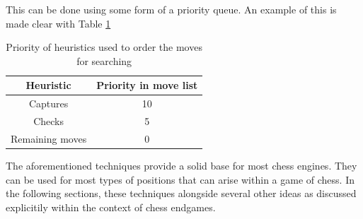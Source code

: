 This can be done using some form of a priority queue. An example of this is made clear with Table \ref{tab:heuristicPriorityTable}

\begin{table}[H]
    \centering
    \begin{tabular}{ ||c c|| } 
      \hline
      Heuristic & Priority in move list\\ 
      \hline\hline
      Captures & 10 \\ 
      \hline
      Checks & 5 \\
      \hline
      Remaining moves & 0 \\
      \hline
    \end{tabular}
    \caption{Priority of heuristics used to order the moves for searching}
    \label{tab:heuristicPriorityTable}
\end{table}


The aforementioned techniques provide a solid base for most chess engines. They can be used for most types of positions that can arise within a game of chess. In the following sections, these techniques alongside several other ideas as discussed explicitily within the context of chess endgames.